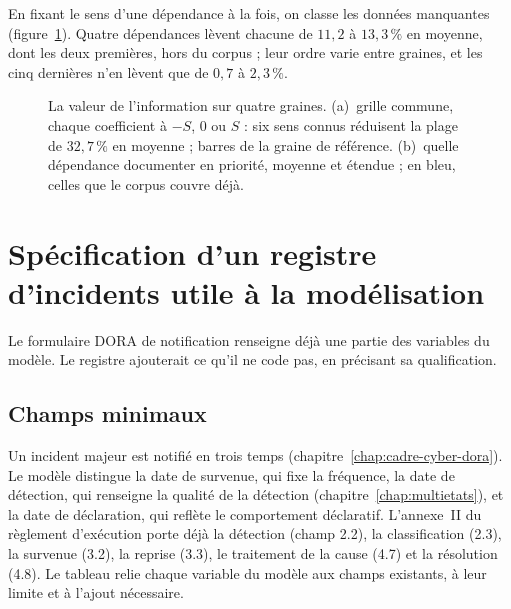 En fixant le sens d'une dépendance à la fois, on classe les données manquantes
(figure~\ref{fig:voi}). Quatre dépendances lèvent chacune de $11{,}2$ à $13{,}3\,\%$ en moyenne, dont les deux premières, hors du corpus ; leur ordre varie entre graines, et les cinq dernières n'en lèvent que de $0{,}7$ à $2{,}3\,\%$.

\begin{figure}[H]
  \centering
  \caption{La valeur de l'information sur quatre graines. (a)~grille commune, chaque coefficient à $-S$, $0$ ou $S$ : six sens connus réduisent la plage de $32{,}7\,\%$ en moyenne ; barres de la graine de référence. (b)~quelle dépendance documenter en
priorité, moyenne et étendue ; en bleu, celles que le corpus couvre déjà.}
  \label{fig:voi}
\end{figure}

\section{Spécification d'un registre d'incidents utile à la modélisation}
\label{sec:spec-registre}

Le formulaire DORA de notification renseigne déjà une partie des variables du modèle. Le registre
ajouterait ce qu'il ne code pas, en précisant sa qualification.

\subsection{Champs minimaux}

Un incident majeur est notifié en trois temps (chapitre~\ref{chap:cadre-cyber-dora}). Le modèle distingue
la date de survenue, qui fixe la fréquence, la date de détection, qui renseigne la qualité de la détection
(chapitre~\ref{chap:multietats}), et la date de déclaration, qui reflète le comportement déclaratif.
L'annexe~II du règlement d'exécution \citep{eu2025_302} porte déjà la détection (champ 2.2), la
classification (2.3), la survenue (3.2), la reprise (3.3), le traitement de la cause (4.7) et la
résolution (4.8). Le tableau relie chaque variable du modèle aux champs existants, à leur limite et à
l'ajout nécessaire.

